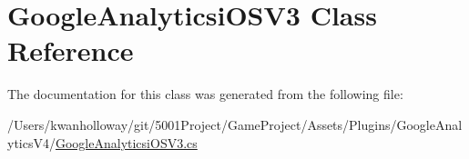 \hypertarget{class_google_analyticsi_o_s_v3}{}\section{Google\+Analyticsi\+O\+S\+V3 Class Reference}
\label{class_google_analyticsi_o_s_v3}


The documentation for this class was generated from the following file\+:\begin{DoxyCompactItemize}
\item 
/\+Users/kwanholloway/git/5001\+Project/\+Game\+Project/\+Assets/\+Plugins/\+Google\+Analytics\+V4/\hyperlink{_google_analyticsi_o_s_v3_8cs}{Google\+Analyticsi\+O\+S\+V3.\+cs}\end{DoxyCompactItemize}
